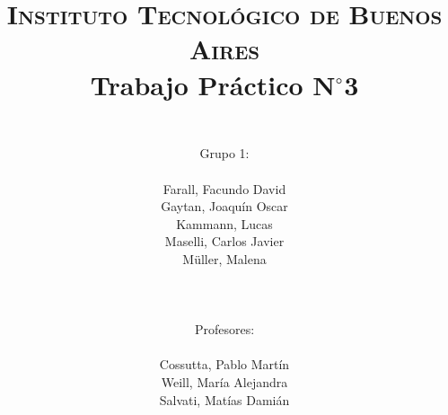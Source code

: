 




	\title{
		\normalfont \normalsize \textsc{Instituto Tecnol\'ogico de Buenos Aires} \\ [25pt]
		\huge Trabajo Pr\'actico N$^{\circ}$3 \\
		\author{
			\\Grupo 1:\\\\Farall, Facundo David\\Gaytan, Joaqu\'in Oscar\\Kammann, Lucas\\Maselli, Carlos Javier\\M\"uller, Malena \\ \\ \\ \\
			Profesores: \\\\ Cossutta, Pablo Mart\'in\\Weill, Mar\'ia Alejandra\\Salvati, Mat\'ias Dami\'an \\ \\ \\ 
		}
	}
	\maketitle
	\newpage

	\tableofcontents

	\newpage
	
	\newpage
	
	\newpage
	
	\newpage
	
	\newpage
	
	\newpage
	


